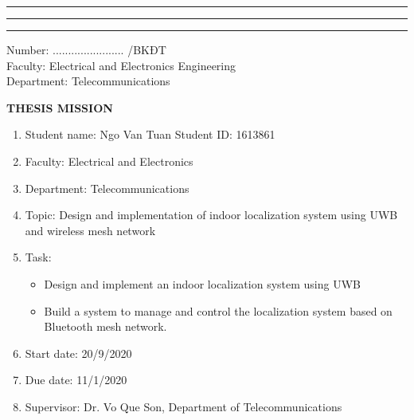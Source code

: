 \documentclass[\main/main.tex]{subfiles}
\begin{document}
\graphicspath{{imgs/}{00_misc/imgs/}}


\rule{\textwidth}{1pt}
\begin{minipage}{0.45\textwidth}
    \vspace{3mm}
    \begin{center}
        \fontsize{7}{12}\selectfont{VIETNAM NATIONAL UNIVERSITY HO CHI MINH CITY\\
                 HO CHI MINH CITY UNIVERSITY OF TECHNOLOGY\\}
    \rule{\textwidth}{1pt}
    \end{center}
\end{minipage}
\hfill
\begin{minipage}{0.45\textwidth}
    \vspace{3mm}
    \begin{center}
        \fontsize{7}{12}\selectfont{SOCIALIST REPUBLIC OF VIETNAM\\
    INDEPENDENCE-FREEDOM-HAPPINESS\\}
    \rule{\textwidth}{1pt}
    \end{center}
\end{minipage}

\begin{flushleft}
    \parbox[t][1.5cm]{10cm}
    {
        Number: ....................... /BKĐT \\
        Faculty: Electrical and Electronics Engineering \\
        Department: Telecommunications
    }
\end{flushleft}

\vspace{3mm}
\begin{center}
    \textbf{THESIS MISSION}
\end{center}
\vspace{3mm}

\begin{enumerate}
    \item Student name: Ngo Van Tuan \hspace{3cm} Student ID: 1613861
    \item Faculty: Electrical and Electronics
    \item Department: Telecommunications
    \item Topic: Design and implementation of indoor localization system using UWB and wireless mesh network 
    \item Task: \begin{itemize}
        \item Design and implement an indoor localization system using UWB
        \item Build a system to manage and control the localization system based on Bluetooth mesh network.
    \end{itemize}
    \item Start date: 20/9/2020
    \item Due date: 11/1/2020
    \item Supervisor: Dr. Vo Que Son, Department of Telecommunications
\end{enumerate}
\end{document}
